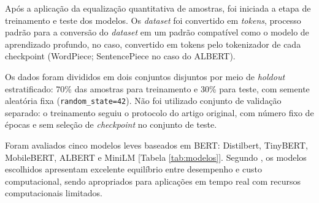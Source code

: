 \documentclass[12pt]{article}
\begin{document}

            Após a aplicação da equalização quantitativa de amostras, foi iniciada a etapa de treinamento e teste dos modelos. Os \textit{dataset} foi  convertido em \textit{tokens}, processo padrão para a conversão do \textit{dataset} em um padrão compatível como o modelo de aprendizado profundo, no caso, convertido em tokens pelo tokenizador de cada checkpoint (WordPiece; SentencePiece no caso do ALBERT).
            
            Os dados foram divididos em dois conjuntos disjuntos por meio de \textit{holdout} estratificado: 70\% das amostras para treinamento e 30\% para teste, com semente aleatória fixa (\texttt{random\_state=42}). Não foi utilizado conjunto de validação separado: o treinamento seguiu o protocolo do artigo original, com número fixo de épocas e sem seleção de \textit{checkpoint} no conjunto de teste.
            
            Foram avaliados cinco modelos leves baseados em BERT: Distilbert, TinyBERT, MobileBERT, ALBERT e MiniLM  [Tabela  \ref{tab:modelos}]. Segundo \cite{bispo2025philder}, os modelos escolhidos apresentam excelente equilíbrio entre desempenho e custo computacional, sendo apropriados para aplicações em tempo real com recursos computacionais limitados.
            
         
            
\end{document}

